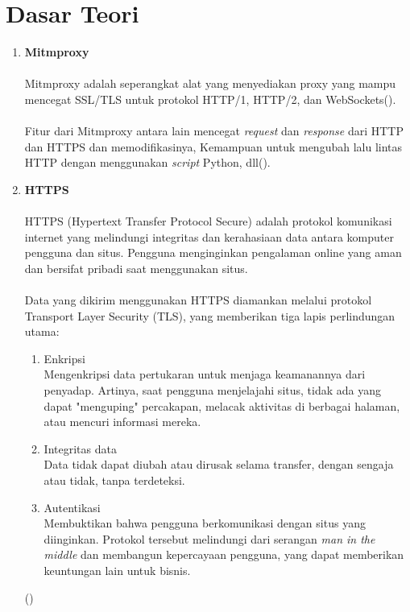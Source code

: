 \documentclass[./bab_2.tex]{subfiles}
\begin{document}
\section{Dasar Teori}
\begin{enumerate}[label=\textbf{\arabic*.}]
  \item \textbf{Mitmproxy}
  \paragraph*{}Mitmproxy adalah seperangkat alat yang
  menyediakan proxy yang mampu mencegat SSL/TLS untuk
  protokol HTTP/1, HTTP/2, dan WebSockets(\cite{mitmproxy}).

  \paragraph*{}Fitur dari Mitmproxy antara lain mencegat
  \textit{request} dan \textit{response} dari  HTTP dan
  HTTPS dan memodifikasinya, Kemampuan untuk mengubah lalu
  lintas HTTP dengan menggunakan \textit{script} Python,
  dll(\cite{mitmproxy}).

  \pagebreak

  \item \textbf{HTTPS}
  \paragraph*{}HTTPS (Hypertext Transfer Protocol Secure)
  adalah protokol komunikasi internet yang melindungi
  integritas dan kerahasiaan data antara komputer pengguna
  dan situs. Pengguna menginginkan pengalaman online yang
  aman dan bersifat pribadi saat menggunakan situs.

  \paragraph*{}Data yang dikirim menggunakan HTTPS diamankan
  melalui protokol Transport Layer Security (TLS), yang
  memberikan tiga lapis perlindungan utama:
  \begin{enumerate}
    \item Enkripsi\\
      Mengenkripsi data pertukaran untuk menjaga keamanannya
      dari penyadap. Artinya, saat pengguna menjelajahi
      situs, tidak ada yang dapat "menguping" percakapan,
      melacak aktivitas di berbagai halaman, atau mencuri
      informasi mereka.
    \item Integritas data\\
      Data tidak dapat diubah atau dirusak selama transfer,
      dengan sengaja atau tidak, tanpa terdeteksi.
    \item Autentikasi\\
      Membuktikan bahwa pengguna berkomunikasi dengan
      situs yang diinginkan. Protokol tersebut melindungi
      dari serangan \textit{man in the middle} dan membangun
      kepercayaan pengguna, yang dapat memberikan keuntungan
      lain untuk bisnis.
  \end{enumerate}
  (\cite{googledev-https})


\end{enumerate}
\end{document}
